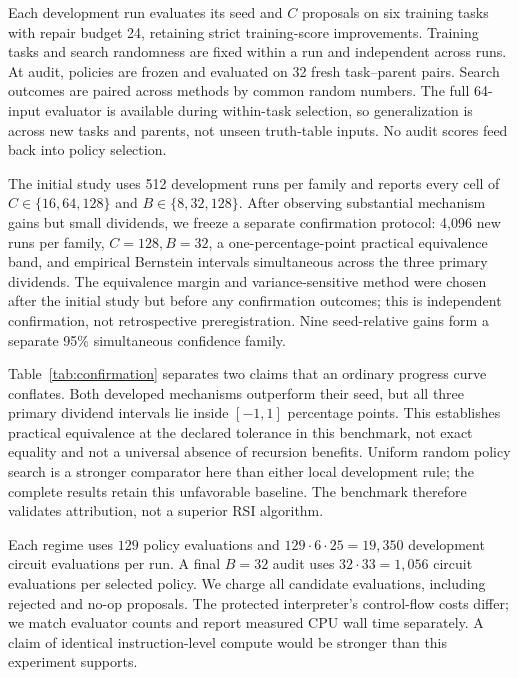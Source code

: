 \documentclass{article}
\theoremstyle{definition}
\begin{document}
Each development run evaluates its seed and $C$ proposals on six training tasks with repair budget 24, retaining strict training-score improvements. Training tasks and search randomness are fixed within a run and independent across runs. At audit, policies are frozen and evaluated on 32 fresh task--parent pairs. Search outcomes are paired across methods by common random numbers. The full 64-input evaluator is available during within-task selection, so generalization is across new tasks and parents, not unseen truth-table inputs. No audit scores feed back into policy selection.

The initial study uses 512 development runs per family and reports every cell of $C\in\{16,64,128\}$ and $B\in\{8,32,128\}$. After observing substantial mechanism gains but small dividends, we freeze a separate confirmation protocol: 4,096 new runs per family, $C=128,B=32$, a one-percentage-point practical equivalence band, and empirical Bernstein intervals simultaneous across the three primary dividends. The equivalence margin and variance-sensitive method were chosen after the initial study but before any confirmation outcomes; this is independent confirmation, not retrospective preregistration. Nine seed-relative gains form a separate 95\% simultaneous confidence family.

\begin{table}[t]
\centering
\caption{Independent confirmation: effects in percentage points of correct truth-table outputs. Intervals for $\Gamma$ use the prespecified finite-sample empirical Bernstein bound, simultaneous across the three families. $D_R,D_F$ are point estimates; their separate simultaneous intervals appear in Appendix~\ref{app:results}.}
\label{tab:confirmation}

\end{table}

Table~\ref{tab:confirmation} separates two claims that an ordinary progress curve conflates. Both developed mechanisms outperform their seed, but all three primary dividend intervals lie inside $[-1,1]$ percentage points. This establishes practical equivalence at the declared tolerance in this benchmark, not exact equality and not a universal absence of recursion benefits. Uniform random policy search is a stronger comparator here than either local development rule; the complete results retain this unfavorable baseline. The benchmark therefore validates attribution, not a superior RSI algorithm.

Each regime uses $129$ policy evaluations and $129\cdot6\cdot25=19,350$ development circuit evaluations per run. A final $B=32$ audit uses $32\cdot33=1,056$ circuit evaluations per selected policy. We charge all candidate evaluations, including rejected and no-op proposals. The protected interpreter's control-flow costs differ; we match evaluator counts and report measured CPU wall time separately. A claim of identical instruction-level compute would be stronger than this experiment supports.
\end{document}
